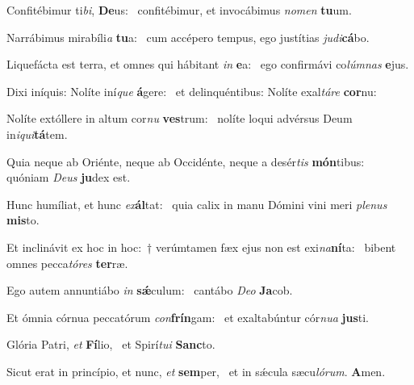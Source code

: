 \item Confitébimur ti\textit{bi}, \textbf{De}us:~\psstar{} confitébimur, et invocábimus \textit{nomen} \textbf{tu}um.
\item Narrábimus mirabíli\textit{a} \textbf{tu}a:~\psstar{} cum accépero tempus, ego justítias \textit{judi}\textbf{cá}bo.
\item Liquefácta est terra, et omnes qui hábitant \textit{in} \textbf{e}a:~\psstar{} ego confirmávi co\textit{lúmnas} \textbf{e}jus.
\item Dixi iníquis: Nolíte iní\textit{que} \textbf{á}gere:~\psstar{} et delinquéntibus: Nolíte exal\textit{táre} \textbf{cor}nu:
\item Nolíte extóllere in altum cor\textit{nu} \textbf{ves}trum:~\psstar{} nolíte loqui advérsus Deum in\textit{iqui}\textbf{tá}tem.
\item Quia neque ab Oriénte, neque ab Occidénte, neque a desér\textit{tis} \textbf{món}tibus:~\psstar{} quóniam \textit{Deus} \textbf{ju}dex est.
\item Hunc humíliat, et hunc \textit{ex}\textbf{ál}tat:~\psstar{} quia calix in manu Dómini vini meri \textit{plenus} \textbf{mis}to.
\item Et inclinávit ex hoc in hoc:~† verúmtamen fæx ejus non est exi\textit{na}\textbf{ní}ta:~\psstar{} bibent omnes pecca\textit{tóres} \textbf{ter}ræ.
\item Ego autem annuntiábo \textit{in} \textbf{sǽ}culum:~\psstar{} cantábo \textit{Deo} \textbf{Ja}cob.
\item Et ómnia córnua peccatórum \textit{con}\textbf{frín}gam:~\psstar{} et exaltabúntur cór\textit{nua} \textbf{jus}ti.
\item Glória Patri, \textit{et} \textbf{Fí}lio,~\psstar{} et Spirí\textit{tui} \textbf{Sanc}to.
\item Sicut erat in princípio, et nunc, \textit{et} \textbf{sem}per,~\psstar{} et in sǽcula sæcu\textit{lórum}. \textbf{A}men.
